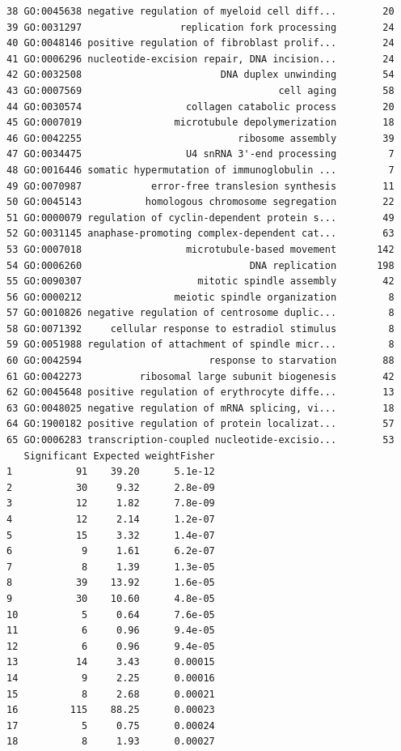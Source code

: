 \documentclass[]{article}
\begin{document}
\begin{verbatim}
38 GO:0045638 negative regulation of myeloid cell diff...        20
39 GO:0031297                 replication fork processing        24
40 GO:0048146 positive regulation of fibroblast prolif...        24
41 GO:0006296 nucleotide-excision repair, DNA incision...        24
42 GO:0032508                        DNA duplex unwinding        54
43 GO:0007569                                  cell aging        58
44 GO:0030574                  collagen catabolic process        20
45 GO:0007019                microtubule depolymerization        18
46 GO:0042255                           ribosome assembly        39
47 GO:0034475                  U4 snRNA 3'-end processing         7
48 GO:0016446 somatic hypermutation of immunoglobulin ...         7
49 GO:0070987            error-free translesion synthesis        11
50 GO:0045143           homologous chromosome segregation        22
51 GO:0000079 regulation of cyclin-dependent protein s...        49
52 GO:0031145 anaphase-promoting complex-dependent cat...        63
53 GO:0007018                  microtubule-based movement       142
54 GO:0006260                             DNA replication       198
55 GO:0090307                    mitotic spindle assembly        42
56 GO:0000212                meiotic spindle organization         8
57 GO:0010826 negative regulation of centrosome duplic...         8
58 GO:0071392     cellular response to estradiol stimulus         8
59 GO:0051988 regulation of attachment of spindle micr...         8
60 GO:0042594                      response to starvation        88
61 GO:0042273          ribosomal large subunit biogenesis        42
62 GO:0045648 positive regulation of erythrocyte diffe...        13
63 GO:0048025 negative regulation of mRNA splicing, vi...        18
64 GO:1900182 positive regulation of protein localizat...        57
65 GO:0006283 transcription-coupled nucleotide-excisio...        53
   Significant Expected weightFisher
1           91    39.20      5.1e-12
2           30     9.32      2.8e-09
3           12     1.82      7.8e-09
4           12     2.14      1.2e-07
5           15     3.32      1.4e-07
6            9     1.61      6.2e-07
7            8     1.39      1.3e-05
8           39    13.92      1.6e-05
9           30    10.60      4.8e-05
10           5     0.64      7.6e-05
11           6     0.96      9.4e-05
12           6     0.96      9.4e-05
13          14     3.43      0.00015
14           9     2.25      0.00016
15           8     2.68      0.00021
16         115    88.25      0.00023
17           5     0.75      0.00024
18           8     1.93      0.00027

\end{verbatim}
\end{document}
